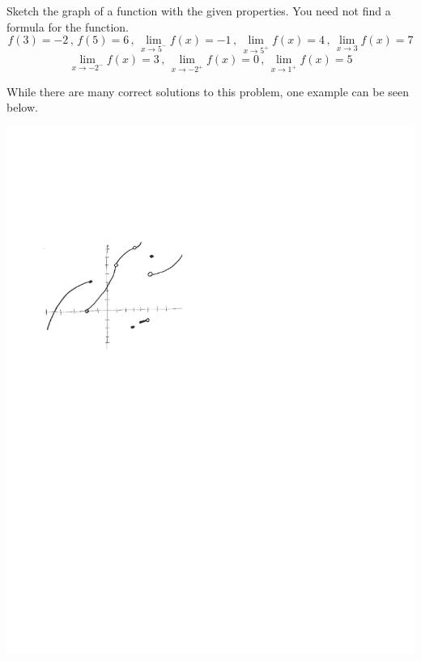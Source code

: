 \documentclass[nooutcomes]{ximera}
\begin{document}
\begin{problem}
\begin{freeResponse}
	\end{freeResponse}
	
\end{problem}
			
			
			

\begin{problem}
Sketch the graph of a function with the given properties.  You need not find a formula for the function.
	$$ f(3) = -2 \, , \, f(5) = 6 \, , \, \lim_{x \to 5^-} f(x) = -1 \, , \,   \lim_{x \to 5^+} f(x) = 4 \, , \,  \lim_{x \to 3} f(x) = 7 $$
	$$  \lim_{x \to -2^-} f(x) = 3 \, , \,  \lim_{x \to -2^+} f(x) = 0 \, , \,  \lim_{x \to 1^+} f(x) = 5  $$
	\begin{freeResponse}
	While there are many correct solutions to this problem, one example can be seen below.
	
		\begin{image}
		\includegraphics[trim= 70 470 250 160]{Figure4.pdf}
		\end{image}
	\end{freeResponse}
\end{problem}
	
\end{document}
